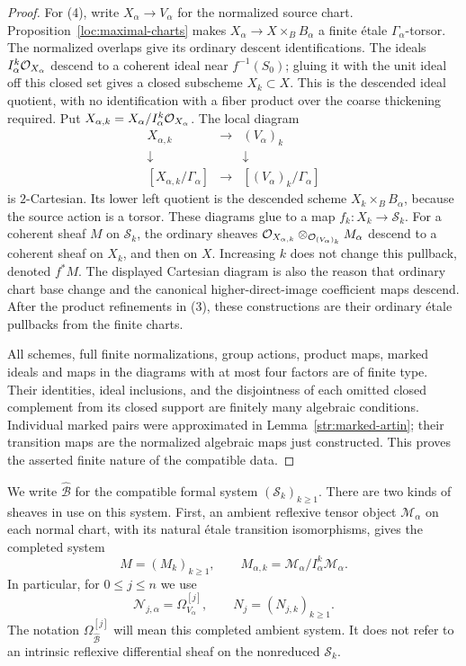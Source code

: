 \begin{proof}
For (4), write $X_\alpha\to V_\alpha$ for the normalized source chart.
Proposition~\ref{loc:maximal-charts} makes
$X_\alpha\to X\times_BB_\alpha$ a finite \'etale
$\Gamma_\alpha$-torsor.  The normalized overlaps give its ordinary
descent identifications.  The ideals
$I_\alpha^k\mathcal O_{X_\alpha}$ descend to a coherent ideal near
$f^{-1}(S_0)$; gluing it with the unit ideal off this closed set gives
a closed subscheme $X_k\subset X$.  This is the descended ideal
quotient, with no identification with a fiber product over the coarse
thickening required.  Put $X_{\alpha,k}=X_\alpha/I_\alpha^k\mathcal O_{X_\alpha}$.
The local diagram
\[
 \begin{array}{ccc}
 X_{\alpha,k}&\longrightarrow&(V_\alpha)_k\\
 \downarrow&&\downarrow\\
 {[X_{\alpha,k}/\Gamma_\alpha]}&\longrightarrow&
       [(V_\alpha)_k/\Gamma_\alpha]
 \end{array}
\]
is $2$-Cartesian.  Its lower left quotient is the descended scheme
$X_k\times_BB_\alpha$, because the source action is a torsor.
These diagrams glue to a map $f_k:X_k\to\mathcal S_k$.
For a coherent sheaf $M$ on $\mathcal S_k$, the ordinary sheaves
$\mathcal O_{X_{\alpha,k}}\otimes_{\mathcal O_{(V_\alpha)_k}}M_\alpha$ descend to
a coherent sheaf on $X_k$, and then on $X$.  Increasing $k$ does not
change this pullback, denoted $f^*M$.  The displayed Cartesian
diagram is also the reason that ordinary chart base change and the
canonical higher-direct-image coefficient maps descend.  After the
product refinements in (3), these constructions are their ordinary
\'etale pullbacks from the finite charts.

All schemes, full finite normalizations, group actions, product maps,
marked ideals and maps in the diagrams with at most four factors are
of finite type.  Their identities, ideal inclusions, and the
disjointness of each omitted closed complement from its closed support
are finitely many algebraic conditions.  Individual marked pairs were
approximated in Lemma~\ref{str:marked-artin}; their transition maps are
the normalized algebraic maps just constructed.  This proves the
asserted finite nature of the compatible data.
\end{proof}

We write $\widehat{\mathcal B}$ for the compatible formal system
$(\mathcal S_k)_{k\geq1}$.  There are two kinds of sheaves in use on this
system.  First, an ambient reflexive tensor object
$\mathcal M_\alpha$ on each normal chart, with its natural \'etale
transition isomorphisms, gives the completed system
\[
 M=(M_k)_{k\geq1},\qquad
 M_{\alpha,k}=\mathcal M_\alpha/I_\alpha^k\mathcal M_\alpha.
\]
In particular, for $0\leq j\leq n$ we use
\[
 \mathcal N_{j,\alpha}=\Omega_{V_\alpha}^{[j]},\qquad
 N_j=(N_{j,k})_{k\geq1}.
\]
The notation $\Omega_{\widehat{\mathcal B}}^{[j]}$ will mean this
completed ambient system.  It does not refer to an intrinsic reflexive
differential sheaf on the nonreduced $\mathcal S_k$.

